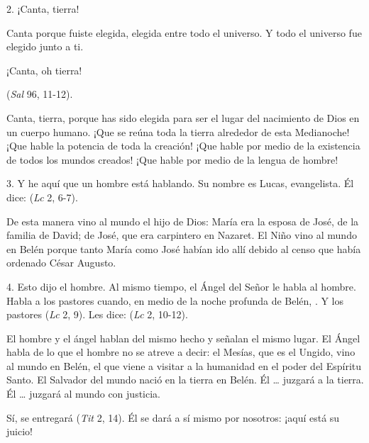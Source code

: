 \begin{body}
\begin{body}
		2. ¡Canta, tierra!

		Canta porque fuiste elegida, elegida entre todo el universo. Y todo el universo fue elegido junto a ti.

		¡Canta, oh tierra!

		 (\emph{Sal} 96, 11-12).

		Canta, tierra, porque has sido elegida para ser el lugar del nacimiento de Dios en un cuerpo humano. ¡Que se reúna toda la tierra alrededor de esta Medianoche! ¡Que hable la potencia de toda la creación! ¡Que hable por medio de la existencia de todos los mundos creados! ¡Que hable por medio de la lengua de hombre!

		3. Y he aquí que un hombre está hablando. Su nombre es Lucas, evangelista. Él dice:  (\emph{Lc} 2, 6-7).

		De esta manera vino al mundo el hijo de Dios: María era la esposa de José, de la familia de David; de José, que era carpintero en Nazaret. El Niño vino al mundo en Belén porque tanto María como José habían ido allí debido al censo que había ordenado César Augusto.

		4. Esto dijo el hombre. Al mismo tiempo, el Ángel del Señor le habla al hombre. Habla a los pastores cuando, en medio de la noche profunda de Belén, . Y los pastores  (\emph{Lc} 2, 9). Les dice:  (\emph{Lc} 2, 10-12).

		El hombre y el ángel hablan del mismo hecho y señalan el mismo lugar. El Ángel habla de lo que el hombre no se atreve a decir: el Mesías, que es el Ungido, vino al mundo en Belén, el que viene a visitar a la humanidad en el poder del Espíritu Santo. El Salvador del mundo nació en la tierra en Belén. Él \ldots{} juzgará a la tierra. Él \ldots{} juzgará al mundo con justicia.

		Sí, se entregará  (\emph{Tit} 2, 14). Él se dará a sí mismo por nosotros: ¡aquí está su juicio!


\end{body}
\end{body}
